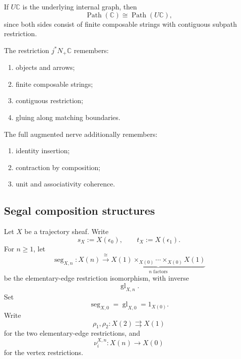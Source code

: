 If \(U\mathbb C\) is the underlying internal graph, then
\[
    \operatorname{Path}(\mathbb C)
    \cong
    \operatorname{Path}(U\mathbb C),
\]
since both sides consist of finite composable strings with contiguous
subpath restriction.

The restriction \(j^\ast N_+\mathbb C\) remembers:
\begin{enumerate}
    \item objects and arrows;
    \item finite composable strings;
    \item contiguous restriction;
    \item gluing along matching boundaries.
\end{enumerate}
The full augmented nerve additionally remembers:
\begin{enumerate}
    \item identity insertion;
    \item contraction by composition;
    \item unit and associativity coherence.
\end{enumerate}

\subsection{Segal composition structures}
\label{subsec:segal-composition-structures}

Let \(X\) be a trajectory sheaf. Write
\[
    s_X:=X(\epsilon_0),
    \qquad
    t_X:=X(\epsilon_1).
\]
For \(n\geq1\), let
\[
    \operatorname{seg}_{X,n}:
    X(n)
    \xrightarrow{\cong}
    \underbrace{
    X(1)\times_{X(0)}\cdots\times_{X(0)}X(1)
    }_{n\text{ factors}}
\]
be the elementary-edge restriction isomorphism, with inverse
\[
    \operatorname{gl}_{X,n}.
\]
Set
\[
    \operatorname{seg}_{X,0}
    =
    \operatorname{gl}_{X,0}
    =
    1_{X(0)}.
\]
Write
\[
    \rho_1,\rho_2:X(2)\rightrightarrows X(1)
\]
for the two elementary-edge restrictions, and
\[
    \nu_i^{X,n}:X(n)\to X(0)
\]
for the vertex restrictions.

